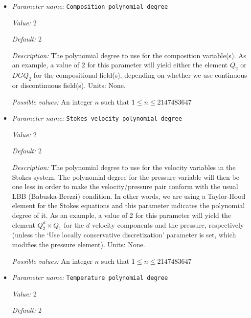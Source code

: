 \begin{itemize}
\item {\it Parameter name:} {\tt Composition polynomial degree}
\label{parameters:Discretization/Composition polynomial degree}


{\it Value:} 2


{\it Default:} 2


{\it Description:} The polynomial degree to use for the composition variable(s). As an example, a value of 2 for this parameter will yield either the element $Q_2$ or $DGQ_2$ for the compositional field(s), depending on whether we use continuous or discontinuous field(s). Units: None.


{\it Possible values:} An integer $n$ such that $1\leq n \leq 2147483647$
\item {\it Parameter name:} {\tt Stokes velocity polynomial degree}
\label{parameters:Discretization/Stokes velocity polynomial degree}


{\it Value:} 2


{\it Default:} 2


{\it Description:} The polynomial degree to use for the velocity variables in the Stokes system. The polynomial degree for the pressure variable will then be one less in order to make the velocity/pressure pair conform with the usual LBB (Babuska-Brezzi) condition. In other words, we are using a Taylor-Hood element for the Stokes equations and this parameter indicates the polynomial degree of it. As an example, a value of 2 for this parameter will yield the element $Q_2^d \times Q_1$ for the $d$ velocity components and the pressure, respectively (unless the `Use locally conservative discretization' parameter is set, which modifies the pressure element). Units: None.


{\it Possible values:} An integer $n$ such that $1\leq n \leq 2147483647$
\item {\it Parameter name:} {\tt Temperature polynomial degree}
\label{parameters:Discretization/Temperature polynomial degree}


{\it Value:} 2


{\it Default:} 2



\end{itemize}
